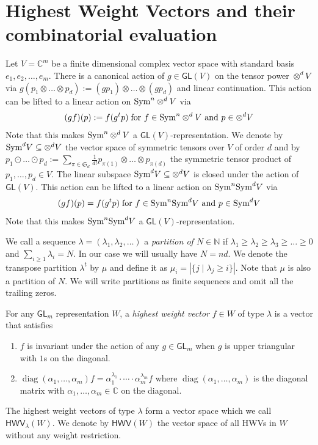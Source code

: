 \documentclass[10pt,a4paper]{article}
\numberwithin{equation}{section}
\theoremstyle{definition}
\newcommand{\Sym}{\textup{Sym}}
\newcommand{\GL}{\mathsf{GL}}
\newcommand{\HWV}{\mathsf{HWV}}
\newcommand{\IC}{\mathbb{C}}
\newcommand{\IN}{\mathbb{N}}
\newcommand{\aS}{\mathfrak{S}}
\DeclareMathOperator{\diag}{diag}
\begin{document}
\section{Highest Weight Vectors and their combinatorial evaluation}
\label{sec:base}
\label{sec:prel}
Let $V = \IC^m$ be a finite dimensional complex vector space with standard basis $e_1, e_2, \ldots, e_m$.
There is a canonical action of $g \in \GL(V)$ on the tensor power $\otimes^d V$ via
$g(p_1 \otimes \dots \otimes p_d) := (gp_1) \otimes \dots \otimes (gp_{d})$ and linear continuation.
This action can be lifted to a linear action on $\Sym^n\otimes^d V$ via
\[
    (gf)(p) := f(g^{t}p)\;\text{for $f \in \Sym^n\otimes^d V$ and $p \in \otimes^d V$}
\]
Note that this makes $\Sym^n\otimes^d V$ a $\GL(V)$-representation.
We denote by $\Sym^d V \subseteq \otimes^d V$ the vector space of symmetric tensors over $V$ of order $d$ and by $p_1 \odot \dots \odot p_d := \sum_{\pi \in \aS_d}\frac{1}{d!} p_{\pi(1)} \otimes \dots \otimes p_{\pi(d)}$ the symmetric tensor product of $p_1, \ldots, p_d \in V$.
The linear subspace $\Sym^d V \subseteq \otimes^d V$ is closed under the action of $\GL(V)$.
This action can be lifted to a linear action on $\Sym^n\Sym^d V$ via
\[
    (gf)(p) = f(g^{t}p)\;\text{for $f \in \Sym^n\Sym^d V$ and $p \in \Sym^d V$}
\]
Note that this makes $\Sym^n\Sym^d V$ a $\GL(V)$-representation.

We call a sequence $\lambda = (\lambda_1, \lambda_2, \dots)$ a \emph{partition of $N \in \IN$} if $\lambda_1 \geq \lambda_2 \geq \lambda_3 \geq \ldots \geq 0$ and $\sum_{i \geq 1}\lambda_i = N$. In our case we will usually have $N=nd$.
We denote the transpose partition $\lambda^t$ by $\mu$ and define it as $\mu_i = |\{j \mid \lambda_j \geq i\}|$.
Note that $\mu$ is also a partition of $N$.
We will write partitions as finite sequences and omit all the trailing zeros.

For any $\GL_m$ representation $W$, a \emph{highest weight vector} $f \in W$ of type $\lambda$ is a vector that satisfies
\begin{enumerate}
    \item $f$ is invariant under the action of any $g \in \GL_m$ when $g$ is upper triangular with $1$s on the diagonal.
    \item $\diag(\alpha_1, \ldots, \alpha_m) f = \alpha_1^{\lambda_1} \cdot \cdots \cdot \alpha_m^{\lambda_m} f$ where $\diag(\alpha_1, \ldots, \alpha_m)$ is the diagonal matrix with $\alpha_1, \ldots, \alpha_m \in \IC$ on the diagonal.
\end{enumerate}
The highest weight vectors of type $\lambda$ form a vector space which we call $\HWV_\lambda(W)$.
We denote by $\HWV(W)$ the vector space of all HWVs in $W$ without any weight restriction.
\end{document}
